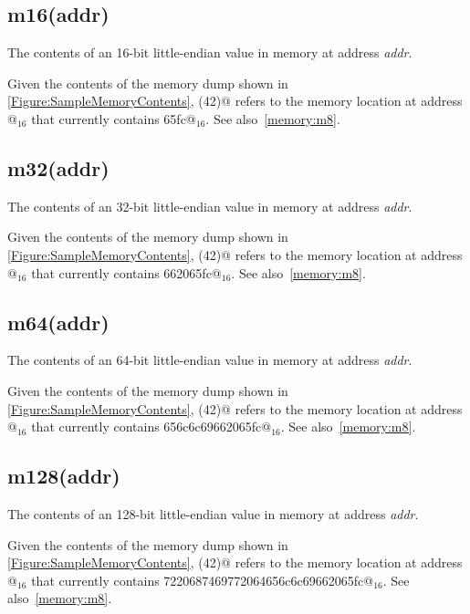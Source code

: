 \subsection{m16(addr)}

The contents of an 16-bit little-endian value in memory at address {\em addr}.

Given the contents of the memory dump shown in 
\autoref{Figure:SampleMemoryContents}, 
(42)@ refers to the memory location at address @$_{16}$
that currently contains \verb@65fc@$_{16}$. See also~\autoref{memory:m8}.


\subsection{m32(addr)}

The contents of an 32-bit little-endian value in memory at address {\em addr}.

Given the contents of the memory dump shown in
\autoref{Figure:SampleMemoryContents},
(42)@ refers to the memory location at address @$_{16}$
that currently contains \verb@662065fc@$_{16}$.
See also~\autoref{memory:m8}.

\subsection{m64(addr)}

The contents of an 64-bit little-endian value in memory at address {\em addr}.

Given the contents of the memory dump shown in 
\autoref{Figure:SampleMemoryContents}, 
(42)@ refers to the memory location at address @$_{16}$
that currently contains \verb@656c6c69662065fc@$_{16}$.
See also~\autoref{memory:m8}.

\subsection{m128(addr)}

The contents of an 128-bit little-endian value in memory at 
address {\em addr}.

Given the contents of the memory dump shown in 
\autoref{Figure:SampleMemoryContents}, 
(42)@ refers to the memory location at address @$_{16}$
that currently contains \verb@7220687469772064656c6c69662065fc@$_{16}$.
See also~\autoref{memory:m8}.

